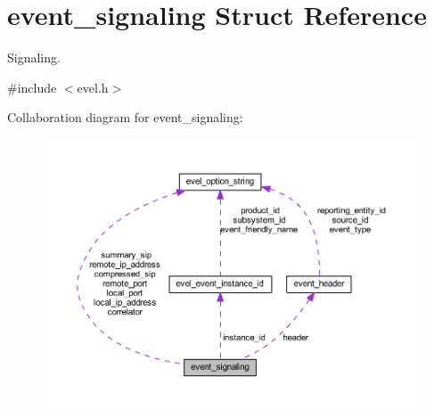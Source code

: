 \hypertarget{structevent__signaling}{}\section{event\+\_\+signaling Struct Reference}
\label{structevent__signaling}


Signaling.  




{\ttfamily \#include $<$evel.\+h$>$}



Collaboration diagram for event\+\_\+signaling\+:
\nopagebreak
\begin{figure}[H]
\begin{center}
\leavevmode
\includegraphics[width=350pt]{structevent__signaling__coll__graph}
\end{center}
\end{figure}
